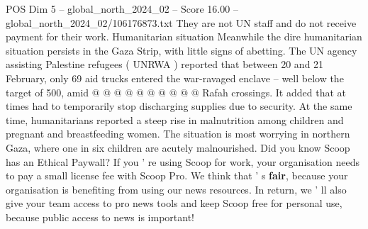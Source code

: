 \begin{textsample}{POS Dim 5 – global\_north\_2024\_02 – Score 16.00 – global\_north\_2024\_02/106176873.txt}
They are not UN staff and do not receive payment for their work.
Humanitarian situation Meanwhile the dire humanitarian situation persists in the Gaza Strip, with little signs of abetting.
The UN agency assisting Palestine refugees ( UNRWA ) reported that between 20 and 21 February, only 69 aid trucks entered the war-ravaged enclave -- well below the target of 500, amid @ @ @ @ @ @ @ @ @ @ Rafah crossings.
It added that at times had to temporarily stop discharging supplies due to security.
At the same time, humanitarians reported a steep rise in malnutrition among children and pregnant and breastfeeding women.
The situation is most worrying in northern Gaza, where one in six children are acutely malnourished.
Did you know Scoop has an Ethical Paywall?
If you ' re using Scoop for work, your organisation needs to pay a small license fee with Scoop Pro.
We think that ' s \textbf{fair}, because your organisation is benefiting from using our news resources.
In return, we ' ll also give your team access to pro news tools and keep Scoop free for personal use, because public access to news is important!

\end{textsample}
